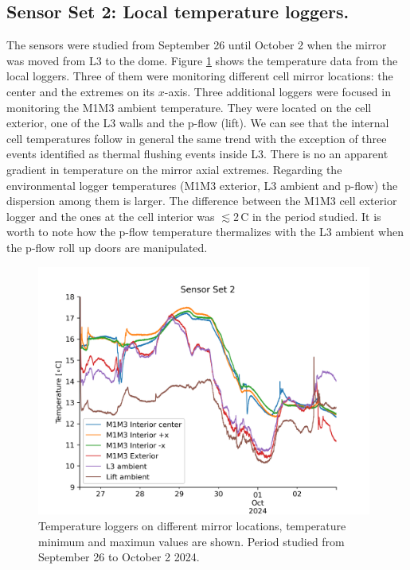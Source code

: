 \documentclass[SE,lsstdraft,authoryear,toc]{lsstdoc}
\begin{document}
\subsection{Sensor Set 2: Local temperature loggers.}
The sensors were studied from September 26 until October 2 when the mirror was moved from L3 to the dome. Figure \ref{fig_set2_raw} shows the temperature data from the local loggers. Three of them were monitoring different cell mirror locations: the center and the extremes on its $x$-axis. Three additional loggers were focused in monitoring the M1M3 ambient temperature. They were located on the cell exterior, one of the L3 walls and the p-flow (lift). We can see that the internal cell temperatures follow in general the same trend with the exception of three events identified as thermal flushing events inside L3. There is no an apparent gradient in temperature on the mirror axial extremes. Regarding the environmental logger temperatures (M1M3 exterior, L3 ambient and p-flow) the dispersion among them is larger. The difference between the M1M3 cell exterior logger and the ones at the cell interior was $\lesssim$2\,\textdegree C in the period studied. It is worth to note how the p-flow temperature thermalizes with the L3 ambient when the p-flow roll up doors are manipulated.

\begin{figure}[h!]
  \centering
  \includegraphics[width=11cm]{SITCOMTN-141_figures/Sensor2_raw.png}
  \caption{Temperature loggers on different mirror locations, temperature minimum and maximun values are shown. Period studied from September 26 to October 2 2024. }
  \label{fig_set2_raw}
\end{figure}
\end{document}
